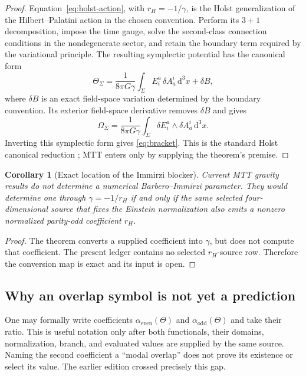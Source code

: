 \documentclass[11pt]{article}
\theoremstyle{plain}
\newtheorem{corollary}[theorem]{Corollary}
\begin{document}
\begin{proof}
Equation~\eqref{eq:holst-action}, with
\(r_H=-1/\gamma\), is the Holst generalization of the
Hilbert--Palatini action in the chosen convention. Perform its \(3+1\)
decomposition, impose the time gauge, solve the second-class connection
conditions in the nondegenerate sector, and retain the boundary term required
by the variational principle. The resulting symplectic potential has the
canonical form
\[
 \Theta_{\Sigma}
 =
 \frac{1}{8\pi G\gamma}
 \int_{\Sigma} E^a_i\,\delta A^i_a\,\mathrm d^3x
 +\delta B,
\]
where \(\delta B\) is an exact field-space variation determined by the
boundary convention. Its exterior field-space derivative removes
\(\delta B\) and gives
\[
 \Omega_{\Sigma}
 =
 \frac{1}{8\pi G\gamma}
 \int_{\Sigma}
 \delta E^a_i\wedge\delta A^i_a\,\mathrm d^3x .
\]
Inverting this symplectic form gives \eqref{eq:bracket}. This is the standard
Holst canonical reduction \cite{Holst1996,Barbero1995,Immirzi1997}; MTT enters
only by supplying the theorem's premise.
\end{proof}

\begin{corollary}[Exact location of the Immirzi blocker]
Current MTT gravity results do not determine a numerical Barbero--Immirzi
parameter. They would determine one through
\(\gamma=-1/r_H\) if and only if the same selected four-dimensional source
that fixes the Einstein normalization also emits a nonzero normalized
parity-odd coefficient \(r_H\).
\end{corollary}

\begin{proof}
The theorem converts a supplied coefficient into \(\gamma\), but does not
compute that coefficient. The present ledger contains no selected
\(r_H\)-source row. Therefore the conversion map is exact and its input is
open.
\end{proof}

\subsection{Why an overlap symbol is not yet a prediction}

One may formally write coefficients
\(\alpha_{\mathrm{even}}(\Theta)\) and
\(\alpha_{\mathrm{odd}}(\Theta)\) and take their ratio. This is useful
notation only after both functionals, their domains, normalization, branch,
and evaluated values are supplied by the same source. Naming the second
coefficient a ``modal overlap'' does not prove its existence or select its
value. The earlier edition crossed precisely this gap.
\end{document}
